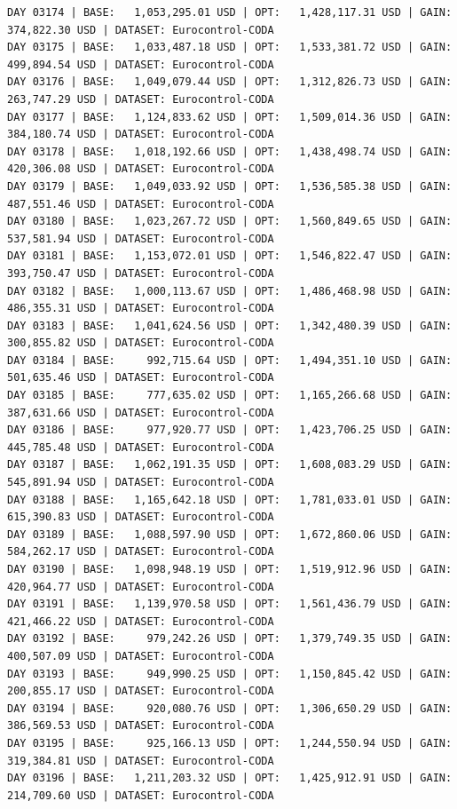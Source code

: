 \documentclass[11pt,a4paper]{article}
\begin{document}
\begin{verbatim}
DAY 03174 | BASE:   1,053,295.01 USD | OPT:   1,428,117.31 USD | GAIN: 374,822.30 USD | DATASET: Eurocontrol-CODA
DAY 03175 | BASE:   1,033,487.18 USD | OPT:   1,533,381.72 USD | GAIN: 499,894.54 USD | DATASET: Eurocontrol-CODA
DAY 03176 | BASE:   1,049,079.44 USD | OPT:   1,312,826.73 USD | GAIN: 263,747.29 USD | DATASET: Eurocontrol-CODA
DAY 03177 | BASE:   1,124,833.62 USD | OPT:   1,509,014.36 USD | GAIN: 384,180.74 USD | DATASET: Eurocontrol-CODA
DAY 03178 | BASE:   1,018,192.66 USD | OPT:   1,438,498.74 USD | GAIN: 420,306.08 USD | DATASET: Eurocontrol-CODA
DAY 03179 | BASE:   1,049,033.92 USD | OPT:   1,536,585.38 USD | GAIN: 487,551.46 USD | DATASET: Eurocontrol-CODA
DAY 03180 | BASE:   1,023,267.72 USD | OPT:   1,560,849.65 USD | GAIN: 537,581.94 USD | DATASET: Eurocontrol-CODA
DAY 03181 | BASE:   1,153,072.01 USD | OPT:   1,546,822.47 USD | GAIN: 393,750.47 USD | DATASET: Eurocontrol-CODA
DAY 03182 | BASE:   1,000,113.67 USD | OPT:   1,486,468.98 USD | GAIN: 486,355.31 USD | DATASET: Eurocontrol-CODA
DAY 03183 | BASE:   1,041,624.56 USD | OPT:   1,342,480.39 USD | GAIN: 300,855.82 USD | DATASET: Eurocontrol-CODA
DAY 03184 | BASE:     992,715.64 USD | OPT:   1,494,351.10 USD | GAIN: 501,635.46 USD | DATASET: Eurocontrol-CODA
DAY 03185 | BASE:     777,635.02 USD | OPT:   1,165,266.68 USD | GAIN: 387,631.66 USD | DATASET: Eurocontrol-CODA
DAY 03186 | BASE:     977,920.77 USD | OPT:   1,423,706.25 USD | GAIN: 445,785.48 USD | DATASET: Eurocontrol-CODA
DAY 03187 | BASE:   1,062,191.35 USD | OPT:   1,608,083.29 USD | GAIN: 545,891.94 USD | DATASET: Eurocontrol-CODA
DAY 03188 | BASE:   1,165,642.18 USD | OPT:   1,781,033.01 USD | GAIN: 615,390.83 USD | DATASET: Eurocontrol-CODA
DAY 03189 | BASE:   1,088,597.90 USD | OPT:   1,672,860.06 USD | GAIN: 584,262.17 USD | DATASET: Eurocontrol-CODA
DAY 03190 | BASE:   1,098,948.19 USD | OPT:   1,519,912.96 USD | GAIN: 420,964.77 USD | DATASET: Eurocontrol-CODA
DAY 03191 | BASE:   1,139,970.58 USD | OPT:   1,561,436.79 USD | GAIN: 421,466.22 USD | DATASET: Eurocontrol-CODA
DAY 03192 | BASE:     979,242.26 USD | OPT:   1,379,749.35 USD | GAIN: 400,507.09 USD | DATASET: Eurocontrol-CODA
DAY 03193 | BASE:     949,990.25 USD | OPT:   1,150,845.42 USD | GAIN: 200,855.17 USD | DATASET: Eurocontrol-CODA
DAY 03194 | BASE:     920,080.76 USD | OPT:   1,306,650.29 USD | GAIN: 386,569.53 USD | DATASET: Eurocontrol-CODA
DAY 03195 | BASE:     925,166.13 USD | OPT:   1,244,550.94 USD | GAIN: 319,384.81 USD | DATASET: Eurocontrol-CODA
DAY 03196 | BASE:   1,211,203.32 USD | OPT:   1,425,912.91 USD | GAIN: 214,709.60 USD | DATASET: Eurocontrol-CODA

\end{verbatim}
\end{document}
